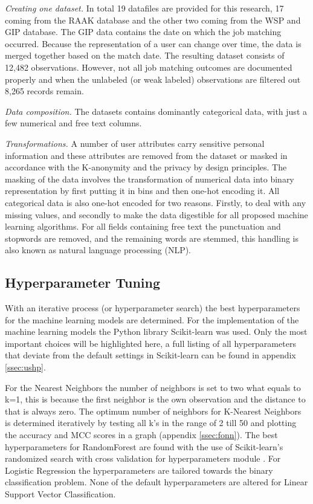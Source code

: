 \textit{Creating one dataset.}
In total 19 datafiles are provided for this research, 17 coming from the RAAK database and the other two coming from the WSP and GIP database.
The GIP data contains the date on which the job matching occurred. 
Because the representation of a user can change over time, the data is merged together based on the match date. 
The resulting dataset consists of 12,482 observations.
However, not all job matching outcomes are documented properly and when the unlabeled (or weak labeled) observations are filtered out 8,265 records remain.

\textit{Data composition.} 
The datasets contains dominantly categorical data, with just a few numerical and free text columns.

\textit{Transformations.}
A number of user attributes carry sensitive personal information and these attributes are removed from the dataset or masked in accordance with the K-anonymity \cite{sweeney2002k} and the privacy by design \cite{d2015privacy} principles.
The masking of the data involves the transformation of numerical data into binary representation by first putting it in bins and then one-hot encoding it. 
All categorical data is also one-hot encoded for two reasons. 
Firstly, to deal with any missing values, and secondly to make the data digestible for all proposed machine learning algorithms. 
For all fields containing free text the punctuation and stopwords are removed, and the remaining words are stemmed, this handling is also known as natural language processing (NLP).

\subsection{Hyperparameter Tuning}
\label{ssec:ht}
With an iterative process (or hyperparameter search) the best hyperparameters for the machine learning models are determined. 
For the implementation of the machine learning models the Python library Scikit-learn was used.
Only the most important choices will be highlighted here, a full listing of all hyperparameters that deviate from the default settings in Scikit-learn can be found in appendix \ref{ssec:ushp}.

For the Nearest Neighbors the number of neighbors is set to two what equals to k=1, this is because the first neighbor is the own observation and the distance to that is always zero.
The optimum number of neighbors for K-Nearest Neighbors is determined iteratively by testing all k’s in the range of 2 till 50 and plotting the accuracy and MCC scores in a graph (appendix \ref{ssec:fonn}).
The best hyperparameters for RandomForest are found with the use of Scikit-learn’s randomized search with cross validation for hyperparameters module \cite{sklearn, bergstra2012random}.
For Logistic Regression the hyperparameters are tailored towards the binary classification problem. 
None of the default hyperparameters are altered for Linear Support Vector Classification. 

